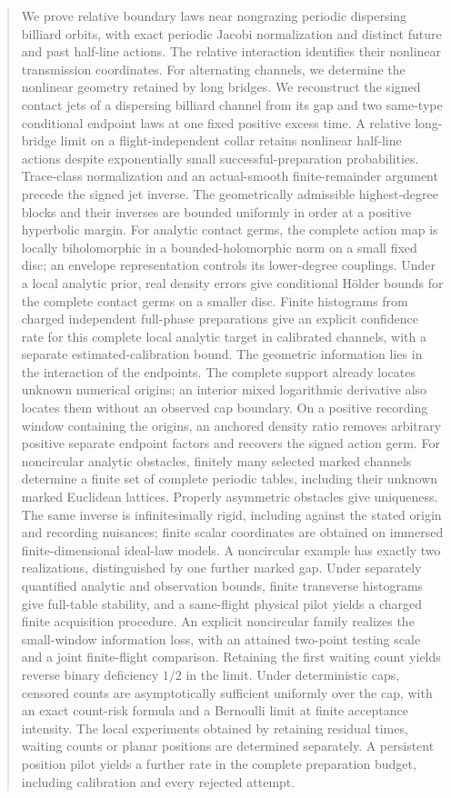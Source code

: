 \begin{abstract}
We prove relative boundary laws near nongrazing periodic dispersing
billiard orbits, with exact periodic Jacobi normalization and distinct
future and past half-line actions.  The relative interaction identifies
their nonlinear transmission coordinates.  For alternating channels,
we determine the nonlinear geometry retained by long bridges.
We reconstruct the signed contact jets of a dispersing billiard channel
from its gap and two same-type conditional endpoint laws at one fixed
positive excess time.  A relative long-bridge limit on a flight-independent
collar retains nonlinear half-line actions despite exponentially small
successful-preparation probabilities.  Trace-class normalization and an
actual-smooth finite-remainder argument precede the signed jet inverse.
The geometrically admissible highest-degree blocks and their inverses
are bounded uniformly in order at a positive hyperbolic margin.
For analytic contact germs, the complete action map is locally
biholomorphic in a bounded-holomorphic norm on a small fixed disc;
an envelope representation controls its lower-degree couplings.
Under a local analytic prior, real density errors give conditional
H\"older bounds for the complete contact germs on a smaller disc.
Finite histograms from charged independent full-phase preparations give
an explicit confidence rate for this complete local analytic target in
calibrated channels, with a separate estimated-calibration bound.
The geometric information lies in the interaction of the endpoints.
The complete support already locates unknown numerical origins; an interior
mixed logarithmic derivative also locates them without an observed cap
boundary.  On a positive recording window containing the origins, an
anchored density ratio removes arbitrary positive separate endpoint factors
and recovers the signed action germ.  For noncircular analytic obstacles, finitely
many selected marked channels determine a finite set of complete periodic
tables, including their unknown marked Euclidean lattices.  Properly
asymmetric obstacles give uniqueness.  The same inverse is infinitesimally
rigid, including against the stated origin and recording nuisances;
finite scalar coordinates are obtained on immersed finite-dimensional
ideal-law models.  A noncircular example has exactly two realizations,
distinguished by one further marked gap.  Under separately quantified
analytic and observation bounds, finite transverse histograms give
full-table stability, and a same-flight physical pilot yields a charged
finite acquisition procedure.  An explicit noncircular family realizes the small-window information
loss, with an attained two-point testing scale and a joint finite-flight
comparison.  Retaining the first waiting count yields reverse binary deficiency
$1/2$ in the limit.  Under deterministic caps, censored counts are
asymptotically sufficient uniformly over the cap, with an exact count-risk
formula and a Bernoulli limit at finite acceptance intensity.
The local experiments obtained by retaining
residual times, waiting counts or planar positions are determined separately.
A persistent position pilot yields a further rate in the complete
preparation budget, including calibration and every rejected attempt.
\end{abstract}
